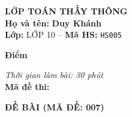 \noindent
\begin{tcolorbox}[colback=white,colframe=black,arc=0mm,boxrule=0.8pt,top=4pt,bottom=4pt,left=6pt,right=6pt]
	\begin{minipage}[c]{0.44\textwidth}
		{\bfseries\large LỚP TOÁN THẦY THÔNG}\\[3pt]
		\textbf{Họ và tên:} \textbf{\large Duy Khánh}\\[3pt]
		\textbf{Lớp:} LỚP 10 \quad -- \quad \textbf{Mã HS:} \texttt{HS005}
	\end{minipage}
	\hfill
	\begin{minipage}[c]{0.22\textwidth}
		\begin{tcolorbox}[colback=white,colframe=black,arc=0mm,boxrule=0.6pt,height=1.8cm,halign=center,valign=top,top=2pt]
			{\bfseries\normalsize Điểm}
		\end{tcolorbox}
	\end{minipage}
	\hfill
	\begin{minipage}[c]{0.30\textwidth}
		\raggedleft
		\textit{Thời gian làm bài: 30 phút}\\[4pt]
		\textbf{Mã đề thi:} 
	\end{minipage}
\end{tcolorbox}
\vspace{0.25cm}

\noindent\textbf{\large ĐỀ BÀI (MÃ ĐỀ: 007)}
\vspace{0.1cm}

